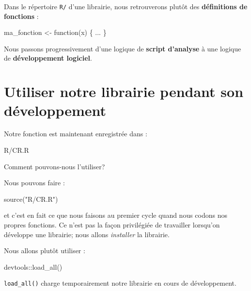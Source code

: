 \documentclass[
  letterpaper,
  DIV=11,
  numbers=noendperiod]{scrreprt}
\newenvironment{Shaded}{\begin{snugshade}}{\end{snugshade}}
\newcommand{\ControlFlowTok}[1]{\textcolor[rgb]{0.00,0.23,0.31}{#1}}
\newcommand{\FunctionTok}[1]{\textcolor[rgb]{0.28,0.35,0.67}{#1}}
\newcommand{\NormalTok}[1]{\textcolor[rgb]{0.00,0.23,0.31}{#1}}
\newcommand{\OtherTok}[1]{\textcolor[rgb]{0.00,0.23,0.31}{#1}}
\newcommand{\SpecialCharTok}[1]{\textcolor[rgb]{0.37,0.37,0.37}{#1}}
\newcommand{\StringTok}[1]{\textcolor[rgb]{0.13,0.47,0.30}{#1}}
\begin{document}
Dans le répertoire \texttt{R/} d'une librairie, nous retrouverons plutôt
des \textbf{définitions de fonctions} :

\begin{Shaded}
\begin{Highlighting}[]
\NormalTok{ma\_fonction }\OtherTok{\textless{}{-}} \ControlFlowTok{function}\NormalTok{(x) \{}
\NormalTok{  ...}
\NormalTok{\}}
\end{Highlighting}
\end{Shaded}

Nous passons progressivement d'une logique de \textbf{script d'analyse}
à une logique de \textbf{développement logiciel}.

\section{Utiliser notre librairie pendant son
développement}\label{utiliser-notre-librairie-pendant-son-duxe9veloppement}

Notre fonction est maintenant enregistrée dans :

\begin{Shaded}
\begin{Highlighting}[]
\NormalTok{R/CR.R}
\end{Highlighting}
\end{Shaded}

Comment pouvons-nous l'utiliser?

Nous pouvons faire :

\begin{Shaded}
\begin{Highlighting}[]
\FunctionTok{source}\NormalTok{(}\StringTok{"R/CR.R"}\NormalTok{)}
\end{Highlighting}
\end{Shaded}

et c'est en fait ce que nous faisons au premier cycle quand nous codons
nos propres fonctions. Ce n'est pas la façon privilégiée de travailler
lorsqu'on développe une librairie; nous allons \emph{installer} la
librairie.

Nous allons plutôt utiliser :

\begin{Shaded}
\begin{Highlighting}[]
\NormalTok{devtools}\SpecialCharTok{::}\FunctionTok{load\_all}\NormalTok{()}
\end{Highlighting}
\end{Shaded}

\texttt{load\_all()} charge temporairement notre librairie en cours de
développement.
\end{document}
